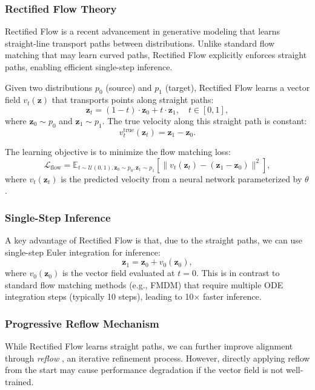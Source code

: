 \documentclass[sigconf]{acmart}
\begin{document}
\subsubsection{\textbf{Rectified Flow Theory}}
Rectified Flow \cite{lipman2023rectified} is a recent advancement in generative modeling that learns straight-line transport paths between distributions. Unlike standard flow matching \cite{liu2022flow} that may learn curved paths, Rectified Flow explicitly enforces straight paths, enabling efficient single-step inference.

Given two distributions $p_0$ (source) and $p_1$ (target), Rectified Flow learns a vector field $v_t(\mathbf z)$ that transports points along straight paths:
\begin{equation}
\label{straight_path}
\mathbf z_t = (1-t) \cdot \mathbf z_0 + t \cdot \mathbf z_1, \quad t \in [0, 1],
\end{equation}
where $\mathbf z_0 \sim p_0$ and $\mathbf z_1 \sim p_1$. The true velocity along this straight path is constant:
\begin{equation}
\label{true_velocity}
v_t^{\text{true}}(\mathbf z_t) = \mathbf z_1 - \mathbf z_0.
\end{equation}

The learning objective is to minimize the flow matching loss:
\begin{equation}
\label{flow_loss}
\mathcal L_{\text{flow}} = \mathbb E_{t \sim \mathcal U(0,1), \mathbf z_0 \sim p_0, \mathbf z_1 \sim p_1} \left[ \|v_t(\mathbf z_t) - (\mathbf z_1 - \mathbf z_0)\|^2 \right],
\end{equation}
where $v_t(\mathbf z_t)$ is the predicted velocity from a neural network parameterized by $\theta$.

\subsubsection{\textbf{Single-Step Inference}}
A key advantage of Rectified Flow is that, due to the straight paths, we can use single-step Euler integration for inference:
\begin{equation}
\label{single_step}
\mathbf z_1 = \mathbf z_0 + v_0(\mathbf z_0),
\end{equation}
where $v_0(\mathbf z_0)$ is the vector field evaluated at $t=0$. This is in contrast to standard flow matching methods (e.g., FMDM) that require multiple ODE integration steps (typically 10 steps), leading to 10$\times$ faster inference.

\subsubsection{\textbf{Progressive Reflow Mechanism}}
While Rectified Flow learns straight paths, we can further improve alignment through \textit{reflow} \cite{lipman2023rectified}, an iterative refinement process. However, directly applying reflow from the start may cause performance degradation if the vector field is not well-trained.
\end{document}
